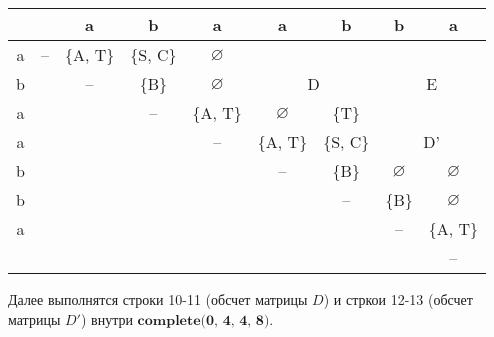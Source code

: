 \documentclass[russian,table]{article}
\begin{document}
\begin{table}[h]
\centering
\begin{tabular}{c|cccccccc}
 &  & a & b & a & a & b & b & a \\ \hline
a & \cellcolor[HTML]{00FF00}-- & \cellcolor[HTML]{00FF00}\{A, T\} & \cellcolor[HTML]{009901}\{S, C\} & \cellcolor[HTML]{009901}$\varnothing$ & \multicolumn{2}{c}{\cellcolor[HTML]{FD6864}} & \multicolumn{2}{c}{\cellcolor[HTML]{FD6864}} \\
b &  & \cellcolor[HTML]{00FF00}-- & \cellcolor[HTML]{009901}\{B\} & \cellcolor[HTML]{009901}$\varnothing$ & \multicolumn{2}{c}{\multirow{-2}{*}{\cellcolor[HTML]{FD6864}D}} & \multicolumn{2}{c}{\multirow{-2}{*}{\cellcolor[HTML]{FD6864}E}} \\
a &  &  & \cellcolor[HTML]{00FF00}-- & \cellcolor[HTML]{00FF00}\{A, T\} & \cellcolor[HTML]{FD6864}$\varnothing$ & \cellcolor[HTML]{FD6864}\{T\} & \multicolumn{2}{c}{\cellcolor[HTML]{FD6864}} \\
a &  &  &  & \cellcolor[HTML]{00FF00}-- & \cellcolor[HTML]{FD6864}\{A, T\} & \cellcolor[HTML]{FD6864}\{S, C\} & \multicolumn{2}{c}{\multirow{-2}{*}{\cellcolor[HTML]{FD6864}D'}} \\
b &  &  &  &  & \cellcolor[HTML]{00FF00}-- & \cellcolor[HTML]{00FF00}\{B\} & \cellcolor[HTML]{009901}$\varnothing$ & \cellcolor[HTML]{009901}$\varnothing$ \\
b &  &  &  &  &  & \cellcolor[HTML]{00FF00}-- & \cellcolor[HTML]{009901}\{B\} & \cellcolor[HTML]{009901}$\varnothing$ \\
a &  &  &  &  &  &  & \cellcolor[HTML]{00FF00}-- & \cellcolor[HTML]{00FF00}\{A, T\} \\
 &  &  &  &  &  &  &  & \cellcolor[HTML]{00FF00}--
\end{tabular}
\end{table}

Далее выполнятся строки 10-11 (обсчет матрицы $D$) и стркои 12-13 (обсчет матрицы $D'$) внутри $\textbf{complete(0, 4, 4, 8)}$.
\end{document}
